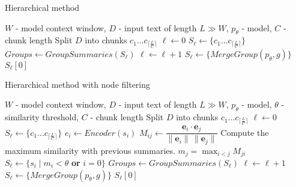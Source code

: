 \documentclass{superfri}
\begin{document}
\noindent
\begin{minipage}[t]{0.49\textwidth}
  \begin{algorithm}[H]
  \caption{Hierarchical method}\label{alg:h}
    \begin{algorithmic}
      \Require $W$ - model context window, $D$ - input text of length $L \gg W$, $p_\theta$ - model, $C$ - chunk length
      \State Split $D$ into chunks $c_1\dots c_{\lceil \frac{L}{C} \rceil}$
      \State $\ell \gets 0$
      \State $S_\ell \gets \{c_1\dots c_{\lceil \frac{L}{C} \rceil}\}$
      \Repeat
        \State $Groups \gets GroupSummaries(S_\ell)$
        \State $\ell \gets \ell + 1$
          \State $S_\ell \gets \{MergeGroup(p_\theta,g)\}$
        \EndFor
      \State \Return $S_\ell[0]$
    \end{algorithmic}
  \end{algorithm}
\end{minipage}\hfill
\begin{minipage}[t]{0.49\textwidth}
  \begin{algorithm}[H]
    \caption{Hierarchical method with node filtering}\label{alg:h_f}
    \begin{algorithmic}
      \Require $W$ - model context window, $D$ - input text of length $L \gg W$, $p_\theta$ - model, $\theta$ - similarity threshold, $C$ - chunk length
      \State Split $D$ into chunks $c_1\dots c_{\lceil \frac{L}{C} \rceil}$
      \State $\ell \gets 0$
      \State $S_\ell \gets \{c_1\dots c_{\lceil \frac{L}{C} \rceil}\}$
      \Repeat
          \State $e_i \gets Encoder(s_i)$
          \State $M_{ij} \gets \dfrac{\mathbf{e}_i\cdot \mathbf{e}_j}{\|\mathbf{e}_i\|\,\|\mathbf{e}_j\|}$
          \State Compute the maximum similarity
        \State with previous summaries.
          \State $m_j=\max_{i<j} M_{ji}$
          \State $S_\ell \gets \{s_i \mid m_i < \theta$ \textbf{ or } $i = 0 \}$
        \EndFor
        \State $Groups \gets GroupSummaries(S_\ell)$
        \State $\ell \gets \ell + 1$
          \State $S_\ell \gets \{MergeGroup(p_\theta,g)\}$
        \EndFor
      \State \Return $S_\ell[0]$
    \end{algorithmic}
  \end{algorithm}
\end{minipage}

\vspace{0.4em}
\end{document}
